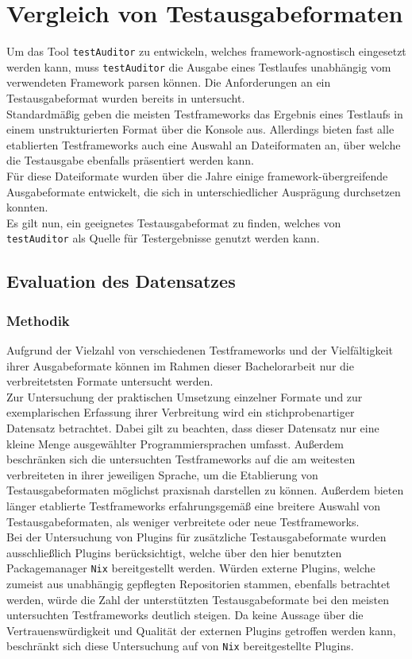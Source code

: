 \chapter{Vergleich von Testausgabeformaten}\label{Vergleich Testausgabefomate}
Um das Tool \texttt{testAuditor} zu entwickeln, welches framework-agnostisch eingesetzt werden kann, muss \texttt{testAuditor} die Ausgabe eines Testlaufes unabhängig vom verwendeten Framework parsen können. Die Anforderungen an ein Testausgabeformat wurden bereits in  untersucht.\\
Standardmäßig geben die meisten Testframeworks das Ergebnis eines Testlaufs in einem unstrukturierten Format über die Konsole aus. Allerdings bieten fast alle etablierten Testframeworks auch eine Auswahl an Dateiformaten an, über welche die Testausgabe ebenfalls präsentiert werden kann.\\
Für diese Dateiformate wurden über die Jahre einige framework-übergreifende Ausgabeformate entwickelt, die sich in unterschiedlicher Ausprägung durchsetzen konnten.\\
Es gilt nun, ein geeignetes Testausgabeformat zu finden, welches von \texttt{testAuditor} als Quelle für Testergebnisse genutzt werden kann. 

\section{Evaluation des Datensatzes}
\subsection{Methodik}
Aufgrund der Vielzahl von verschiedenen Testframeworks und der Vielfältigkeit ihrer Ausgabeformate können im Rahmen dieser Bachelorarbeit nur die verbreitetsten Formate untersucht werden.\\
Zur Untersuchung der praktischen Umsetzung einzelner Formate und zur exemplarischen Erfassung ihrer Verbreitung wird ein stichprobenartiger Datensatz betrachtet. Dabei gilt zu beachten, dass dieser Datensatz nur eine kleine Menge ausgewählter Programmiersprachen umfasst. Außerdem beschränken sich die untersuchten Testframeworks auf die am weitesten verbreiteten in ihrer jeweiligen Sprache, um die Etablierung von Testausgabeformaten möglichst praxisnah darstellen zu können. Außerdem bieten länger etablierte Testframeworks erfahrungsgemäß eine breitere Auswahl von Testausgabeformaten, als weniger verbreitete oder neue Testframeworks.\\
Bei der Untersuchung von Plugins für zusätzliche Testausgabeformate wurden ausschließlich Plugins berücksichtigt, welche über den hier benutzten Packagemanager \texttt{Nix} bereitgestellt werden. Würden externe Plugins, welche zumeist aus unabhängig gepflegten Repositorien stammen, ebenfalls betrachtet werden, würde die Zahl der unterstützten Testausgabeformate bei den meisten untersuchten Testframeworks deutlich steigen. Da keine Aussage über die Vertrauenswürdigkeit und Qualität der externen Plugins getroffen werden kann, beschränkt sich diese Untersuchung auf von \texttt{Nix} bereitgestellte Plugins.
